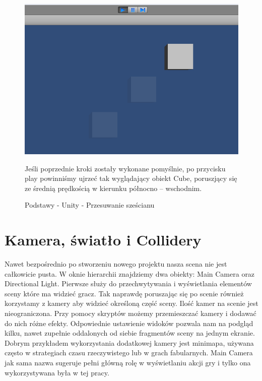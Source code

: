 \documentclass[brudnopis]{xmgr}
\begin{document}
\begin{figure}[!htb]
    \begin{center}
    \includegraphics[scale=0.25]{Screeny/rodzial5screeny/moving_cube}
    \end{center}
    \caption{Podstawy - Unity - Przesuwanie sześcianu}
Jeśli poprzednie kroki zostały wykonane pomyślnie, po przycisku play powinniśmy ujrzeć tak wyglądający obiekt Cube, poruszjący się ze średnią prędkością w kierunku północno – wschodnim.
\end{figure}

\section{Kamera, światło i Collidery}

Nawet bezpośrednio po stworzeniu nowego projektu nasza scena nie jest całkowicie pusta. W oknie hierarchii znajdziemy dwa obiekty: Main Camera oraz Directional Light. Pierwsze służy do przechwytywania i wyświetlania elementów sceny które ma widzieć gracz. Tak naprawdę poruszając się po scenie również korzystamy z kamery aby widzieć określoną część sceny. Ilość kamer na scenie jest nieograniczona. Przy pomocy skryptów możemy przemieszczać kamery i dodawać do nich różne efekty. Odpowiednie ustawienie widoków pozwala nam na podgląd kilku, nawet zupełnie oddalonych od siebie fragmentów sceny na jednym ekranie. Dobrym przykładem wykorzystania dodatkowej kamery jest minimapa, używana często w strategiach czasu rzeczywistego lub w grach fabularnych.  Main Camera jak sama nazwa sugeruje pełni główną rolę w wyświetlaniu akcji gry i tylko ona wykorzystywana była w tej pracy.
\end{document}
